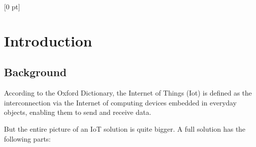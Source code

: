 
\titlespacing{\chapter}{0 pt}{30 pt}{50 pt}[0 pt]
\titleformat{\section}{\Large\bfseries}{\thesection}{0 pt}{\hspace{30 pt}}
\titleformat{\subsection}{\large\bfseries}{\thesubsection}{0 pt}{\hspace{30 pt}}
\pagestyle{fancy}
\fancyhead[LO,LE]{\footnotesize\textit{\leftmark}}
\fancyhead[RO,RE]{\thepage}
\fancyfoot[CO,CE]{}

\chapter{Introduction} %

\normalsize

\section{Background}
\vspace{30 pt}
\noindent
According to the Oxford Dictionary, the Internet of Things (Iot) is defined as 
the interconnection via the Internet of computing devices embedded in everyday 
objects, enabling them to send and receive data. 

But the entire picture of an IoT solution is quite bigger. A full solution has 
the following parts:


